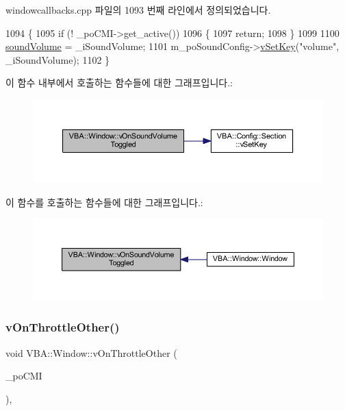 windowcallbacks.\+cpp 파일의 1093 번째 라인에서 정의되었습니다.


\begin{DoxyCode}
1094 \{
1095   \textcolor{keywordflow}{if} (! \_poCMI->get\_active())
1096   \{
1097     \textcolor{keywordflow}{return};
1098   \}
1099 
1100   \mbox{\hyperlink{gb_sound_8cpp_a44346dfa73de6666c4727594bb20f6b7}{soundVolume}} = \_iSoundVolume;
1101   m\_poSoundConfig->\mbox{\hyperlink{class_v_b_a_1_1_config_1_1_section_a57e1b95cbea40db71c093381beff4b0e}{vSetKey}}(\textcolor{stringliteral}{"volume"}, \_iSoundVolume);
1102 \}
\end{DoxyCode}
이 함수 내부에서 호출하는 함수들에 대한 그래프입니다.\+:
\nopagebreak
\begin{figure}[H]
\begin{center}
\leavevmode
\includegraphics[width=350pt]{class_v_b_a_1_1_window_a6e1456ec5b5efc3a5e24d91ed918d503_cgraph}
\end{center}
\end{figure}
이 함수를 호출하는 함수들에 대한 그래프입니다.\+:
\nopagebreak
\begin{figure}[H]
\begin{center}
\leavevmode
\includegraphics[width=350pt]{class_v_b_a_1_1_window_a6e1456ec5b5efc3a5e24d91ed918d503_icgraph}
\end{center}
\end{figure}
\mbox{\label{class_v_b_a_1_1_window_a3d2033ebb1a3ef25bada10bef93e856a}} 
\subsubsection{\texorpdfstring{v\+On\+Throttle\+Other()}{vOnThrottleOther()}}
{\footnotesize\ttfamily void V\+B\+A\+::\+Window\+::v\+On\+Throttle\+Other (\begin{DoxyParamCaption}\item[{Gtk\+::\+Check\+Menu\+Item $\ast$}]{\+\_\+po\+C\+MI }\end{DoxyParamCaption})\hspace{0.3cm}{\ttfamily [protected]}, {\ttfamily [virtual]}}



